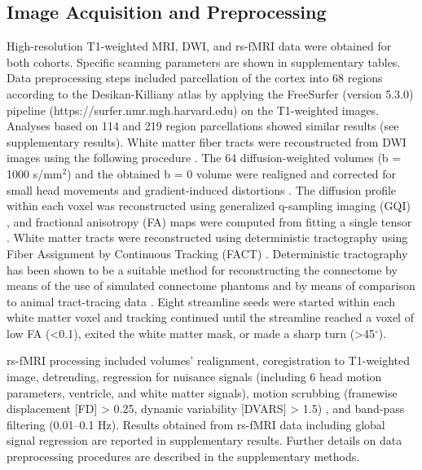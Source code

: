 \begin{refsection}
\subsection*{Image Acquisition and Preprocessing}
High-resolution T1-weighted MRI, DWI, and rs-fMRI data were obtained for both cohorts. Specific scanning parameters are shown in supplementary tables. Data preprocessing steps \citep{vanDenHeuvel2013AbnormalRC} included parcellation of the cortex into 68 regions according to the Desikan-Killiany atlas \citep{DESIKAN2006968} by applying the FreeSurfer (version 5.3.0) pipeline (https://surfer.nmr.mgh.harvard.edu) on the T1-weighted images. Analyses based on 114 and 219 region parcellations \citep{CAMMOUN2012386} showed similar results (see supplementary results). White matter fiber tracts were reconstructed from DWI images using the following procedure \citep{VANDENHEUVEL2016293}. The 64 diffusion-weighted volumes (b = 1000 s/mm$^{2}$) and the obtained b = 0 volume were realigned and corrected for small head movements and gradient-induced distortions \citep{ANDERSSON2002177}. The diffusion profile within each voxel was reconstructed using generalized q-sampling imaging (GQI) \citep{YEH2010}, and fractional anisotropy (FA) maps were computed from fitting a single tensor \citep{Chang2005RESTORERE}. White matter tracts were reconstructed using deterministic tractography using Fiber Assignment by Continuous Tracking (FACT) \citep{Mori2002FiberTP}. Deterministic tractography has been shown to be a suitable method for reconstructing the connectome by means of the use of simulated connectome phantoms \citep{Sarwar2019MappingCW} and by means of comparison to animal tract-tracing data \citep{vanDenHeuvel2015ComparisonOD,Shen2019ExploringTL}. Eight streamline seeds were started within each white matter voxel and tracking continued until the streamline reached a voxel of low FA (<0.1), exited the white matter mask, or made a sharp turn (>45$^{\circ}$).

rs-fMRI processing included volumes’ realignment, coregistration to T1-weighted image, detrending, regression for nuisance signals (including 6 head motion parameters, ventricle, and white matter signals), motion scrubbing (framewise displacement [FD] > 0.25, dynamic variability [DVARS] > 1.5) \citep{Power2012SpuriousBS}, and band-pass filtering (0.01–0.1 Hz). Results obtained from rs-fMRI data including global signal regression are reported in supplementary results. Further details on data preprocessing procedures are described in the supplementary methods.


\end{refsection}
